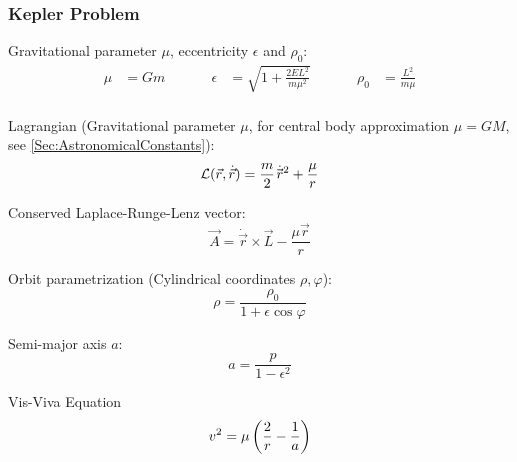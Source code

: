 		\subsubsection{Kepler Problem}
			\noindent
			Gravitational parameter  $\mu$, eccentricity $\epsilon$ and $\rho_0$:
			\begin{equation}
				\begin{aligned}
					\mu &= G m &\hspace{30pt}
					\epsilon &= \sqrt{1+\frac{2 E L^2}{m \mu^2}} &\hspace{30pt}
					\rho_0 &= \frac{L^2}{m\mu} \\
				\end{aligned}
			\end{equation}

			\noindent
			Lagrangian (Gravitational parameter $\mu$, for central body approximation $\mu=GM$, see \ref{Sec:AstronomicalConstants}):
			\begin{equation}
				\mathcal{L}(\vec{r},\dot{\vec{r}}) = \frac{m}{2} \dot{\pvec{r}}^2 + \frac{\mu}{r}
			\end{equation}

			\noindent
			Conserved Laplace-Runge-Lenz vector:%
			\begin{equation}
				\vec{A} = \dot{\vec{r}}\times\vec{L} - \frac{\mu \vec{r}}{r}
			\end{equation}

			\noindent
			Orbit parametrization (Cylindrical coordinates $\rho, \varphi$):
			\begin{equation}
				\rho = \frac{\rho_0}{1+\epsilon \cos\varphi}
			\end{equation}

			\noindent
			Semi-major axis $a$:
			\begin{equation}
				a = \frac{p}{1-\epsilon^2}
			\end{equation}

			\noindent
			Vis-Viva Equation
			\begin{equation}
				v^2 = \mu\left( \frac{2}{r} - \frac{1}{a} \right)
			\end{equation}
